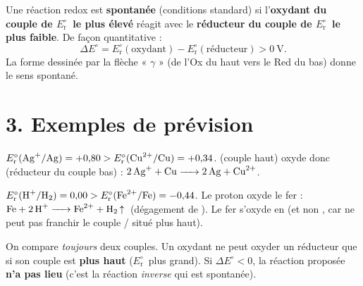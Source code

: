 \documentclass[11pt,a4paper]{article}
\newcommand{\Ered}{\ensuremath{E_{\mathrm{r}}^{\circ}}}
\begin{document}
\begin{center}
\end{center}

\begin{regle}
Une réaction redox est \textbf{spontanée} (conditions standard) si l'\textbf{oxydant du couple de
\Ered\ le plus élevé} réagit avec le \textbf{réducteur du couple de \Ered\ le plus faible}.
De façon quantitative :
\[
\Delta E^{\circ} = \Ered(\text{oxydant}) - \Ered(\text{réducteur}) > 0 \ \text{V}.
\]
La forme dessinée par la flèche « $\gamma$ » (de l'Ox du haut vers le Red du bas) donne le sens
spontané.
\end{regle}

\section*{3. Exemples de prévision}
\begin{exemple}
$\Ered(\ce{Ag+}/\ce{Ag})=+0{,}80 > \Ered(\ce{Cu^{2+}}/\ce{Cu})=+0{,}34$.  (couple haut) oxyde
donc  (réducteur du couple bas) : $\ce{2 Ag+ + Cu -> 2 Ag + Cu^{2+}}$.
\end{exemple}

\begin{exemple}
$\Ered(\ce{H+}/\ce{H2})=0{,}00 > \Ered(\ce{Fe^{2+}}/\ce{Fe})=-0{,}44$. Le proton  oxyde le fer :
$\ce{Fe + 2 H+ -> Fe^{2+} + H2 ^}$ (dégagement de ). Le fer s'oxyde en  (et non
, car  ne peut pas franchir le couple / situé plus haut).
\end{exemple}

\begin{attention}
On compare \emph{toujours} deux couples. Un oxydant ne peut oxyder un réducteur que si son couple
est \textbf{plus haut} (\Ered\ plus grand). Si $\Delta E^{\circ}<0$, la réaction proposée \textbf{n'a
pas lieu} (c'est la réaction \emph{inverse} qui est spontanée).
\end{attention}
\end{document}
